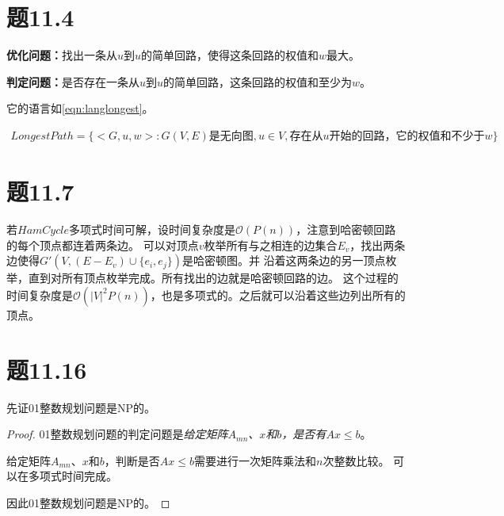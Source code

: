\documentclass[a4paper,twoside]{article}
\begin{document}
\begin{spacing}{1.2}
\section{题11.4}

\textbf{优化问题：}找出一条从$u$到$u$的简单回路，使得这条回路的权值和$w$最大。

\textbf{判定问题：}是否存在一条从$u$到$u$的简单回路，这条回路的权值和至少为$w$。

它的语言如\eqref{eqn:langlongest}。

\begin{equation}
	\label{eqn:langlongest}
	\begin{aligned}
		LongestPath=\{ <G,u,w>: G(V,E)\mbox{是无向图}, u\in V, \mbox{存在从}u\mbox{开始的回路，它的权值和不少于}w \}
	\end{aligned}
\end{equation}

\section{题11.7}

若$HamCycle$多项式时间可解，设时间复杂度是$\mathcal{O}(P(n))$，注意到哈密顿回路的每个顶点都连着两条边。
可以对顶点$v$枚举所有与之相连的边集合$E_v$，找出两条边使得$G'(V,(E-E_v)\cup \{e_i,e_j\})$是哈密顿图。并
沿着这两条边的另一顶点枚举，直到对所有顶点枚举完成。所有找出的边就是哈密顿回路的边。
这个过程的时间复杂度是$\mathcal{O}(|V|^2P(n))$，也是多项式的。之后就可以沿着这些边列出所有的顶点。


\section{题11.16}

先证01整数规划问题是NP的。
\begin{proof}
	01整数规划问题的判定问题是\emph{给定矩阵$A_{mn}$、$x$和$b$，是否有$Ax\le b$}。
	
	给定矩阵$A_{mn}$、$x$和$b$，判断是否$Ax\le b$需要进行一次矩阵乘法和$n$次整数比较。
	可以在多项式时间完成。

	因此01整数规划问题是NP的。
\end{proof}


\end{spacing}
\end{document}
